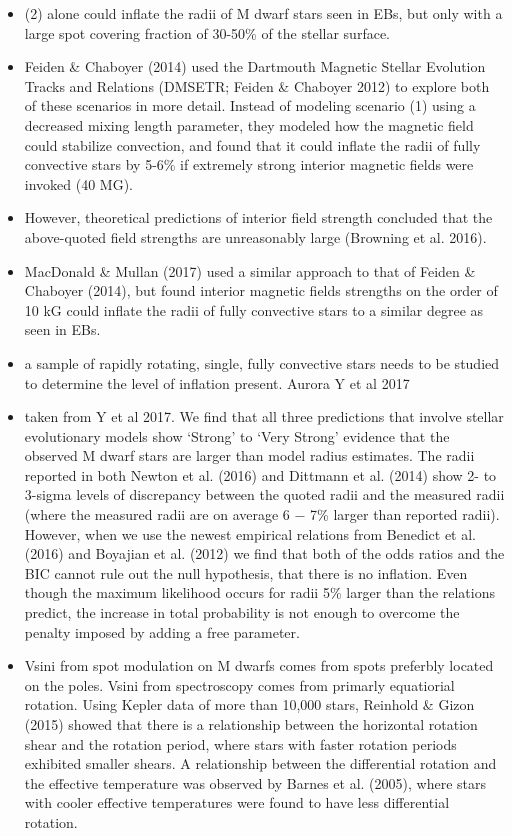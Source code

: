 \begin{itemize}
\item (2) alone could inflate the radii of M dwarf stars seen in EBs, but only with a large spot covering fraction of 30-50\% of the stellar surface.

\item Feiden \& Chaboyer (2014) used the Dartmouth Magnetic Stellar Evolution Tracks and Relations (DMSETR; Feiden \& Chaboyer 2012) to explore both of these scenarios in more detail. Instead of modeling scenario (1) using a decreased mixing length parameter, they modeled how the magnetic field could stabilize convection, and found that it could inflate the radii of fully convective stars by 5-6\% if extremely strong interior magnetic fields were invoked (40 MG).

\item However, theoretical predictions of interior field strength concluded that the above-quoted field strengths are unreasonably large (Browning et al. 2016).

\item MacDonald \& Mullan (2017) used a similar approach to that of Feiden \& Chaboyer (2014), but found interior magnetic fields strengths on the order of 10 kG could inflate the radii of fully convective stars to a similar degree as seen in EBs.

\item  a sample of rapidly rotating, single, fully convective stars needs to be studied to determine the level of inflation present. Aurora Y et al 2017

\item taken from Y et al 2017. We find that all three predictions that involve stellar evolutionary models show ‘Strong’ to ‘Very Strong’ evidence that the observed M dwarf stars are larger than model radius estimates. The radii reported in both Newton et al. (2016) and Dittmann et al. (2014) show 2- to 3-sigma levels of discrepancy between the quoted radii and the measured radii (where the measured radii are on average 6 − 7\% larger than reported radii). However, when we use the newest empirical relations from Benedict et al. (2016) and Boyajian et al. (2012) we find that both of the odds ratios and the BIC cannot rule out the null hypothesis, that there is no inflation. Even though the maximum likelihood occurs for radii 5\% larger than the relations predict, the increase in total probability is not enough to overcome the penalty imposed by adding a free parameter.

\item Vsini from spot modulation on M dwarfs comes from spots preferbly located on  the poles. Vsini from spectroscopy comes from primarly equatiorial rotation. Using Kepler data of more than 10,000 stars, Reinhold \& Gizon (2015) showed that there is a relationship between the horizontal rotation shear and the rotation period, where stars with faster rotation periods exhibited smaller shears. A relationship between the differential rotation and the effective temperature was observed by Barnes et al. (2005), where stars with cooler effective temperatures were found to have less differential rotation.


\end{itemize}
